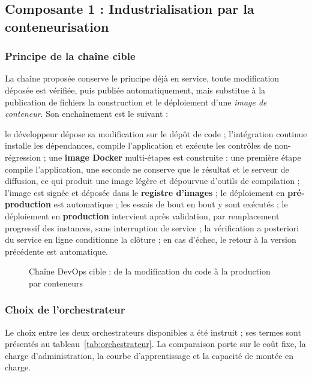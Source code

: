 \subsection{Composante 1 : Industrialisation par la conteneurisation}

\subsubsection{Principe de la chaîne cible}

La chaîne proposée conserve le principe déjà en service, toute modification
déposée est vérifiée, puis publiée automatiquement, mais substitue à la
publication de fichiers la construction et le déploiement d'une \emph{image de
conteneur}. Son enchaînement est le suivant :

le développeur dépose sa modification sur le dépôt de code ; l'intégration
continue installe les dépendances, compile l'application et exécute les
contrôles de non-régression ; une \textbf{image Docker} multi-étapes est
construite : une première étape compile l'application, une seconde ne conserve
que le résultat et le serveur de diffusion, ce qui produit une image légère et
dépourvue d'outils de compilation ; l'image est signée et déposée dans le
\textbf{registre d'images} ; le déploiement en \textbf{pré-production} est
automatique ; les essais de bout en bout y sont exécutés ; le déploiement en
\textbf{production} intervient après validation, par remplacement progressif
des instances, sans interruption de service ; la vérification a posteriori du
service en ligne conditionne la clôture ; en cas d'échec, le retour à la
version précédente est automatique.

\begin{figure}[!ht]
\centering
{}
\caption{Chaîne DevOps cible : de la modification du code à la production par conteneurs}
\label{fig:devops-cible}
\end{figure}

\subsubsection{Choix de l'orchestrateur}

Le choix entre les deux orchestrateurs disponibles a été instruit ; ses termes
sont présentés au tableau~\ref{tab:orchestrateur}. La
comparaison porte sur le coût fixe, la charge d'administration, la courbe
d'apprentissage et la capacité de montée en charge.

